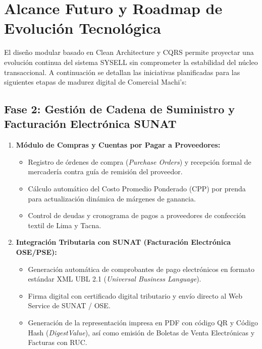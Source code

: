 
\section{Alcance Futuro y Roadmap de Evolución Tecnológica}

El diseño modular basado en Clean Architecture y CQRS permite proyectar una evolución continua del sistema SYSELL sin comprometer la estabilidad del núcleo transaccional. A continuación se detallan las iniciativas planificadas para las siguientes etapas de madurez digital de Comercial Machi's:

\subsection{Fase 2: Gestión de Cadena de Suministro y Facturación Electrónica SUNAT}

\begin{enumerate}[leftmargin=*]
    \item \textbf{Módulo de Compras y Cuentas por Pagar a Proveedores:}
    \begin{itemize}
        \item Registro de órdenes de compra (\textit{Purchase Orders}) y recepción formal de mercadería contra guía de remisión del proveedor.
        \item Cálculo automático del Costo Promedio Ponderado (CPP) por prenda para actualización dinámica de márgenes de ganancia.
        \item Control de deudas y cronograma de pagos a proveedores de confección textil de Lima y Tacna.
    \end{itemize}

    \item \textbf{Integración Tributaria con SUNAT (Facturación Electrónica OSE/PSE):}
    \begin{itemize}
        \item Generación automática de comprobantes de pago electrónicos en formato estándar XML UBL 2.1 (\textit{Universal Business Language}).
        \item Firma digital con certificado digital tributario y envío directo al Web Service de SUNAT / OSE.
        \item Generación de la representación impresa en PDF con código QR y Código Hash (\textit{DigestValue}), así como emisión de Boletas de Venta Electrónicas y Facturas con RUC.
    \end{itemize}
\end{enumerate}

